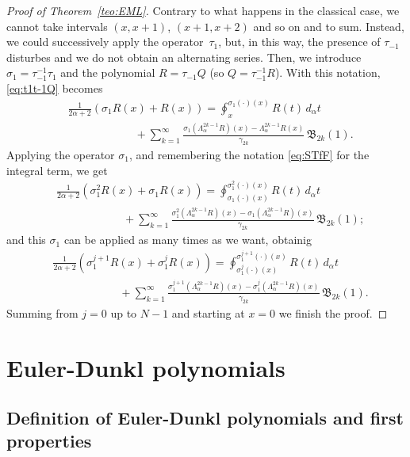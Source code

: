 \documentclass[10pt]{article}
\theoremstyle{plain}
\theoremstyle{definition}
\numberwithin{equation}{section} %
\newcommand{\La}{\Lambda_{\alpha}}
\newcommand{\B}{\mathfrak{B}}
\newcommand{\cc}{\gamma}
\begin{document}
\begin{proof}[Proof of Theorem~\ref{teo:EML}]
Contrary to what happens in the classical case, we cannot take intervals $(x,x+1)$, $(x+1,x+2)$ and so on and to sum. Instead, we could successively apply the operator~$\tau_1$, but, in this way, the presence of $\tau_{-1}$ disturbes and we do not obtain an alternating series. Then, we introduce $\sigma_1 = \tau_{-1}^{-1}\tau_1$ and the polynomial $R = \tau_{-1}Q$ (so $Q = \tau_{-1}^{-1}R$).
With this notation, \eqref{eq:t1t-1Q} becomes
\begin{align*}
  &\frac{1}{2\alpha+2} (\sigma_1 R(x)+ R(x)) 
  = \oint_{x}^{\sigma_1(\cdot)(x)} R(t)\,d_\alpha t \\
  &\qquad\qquad\qquad + \sum_{k=1}^{\infty} \frac{\sigma_1(\La^{2k-1} R)(x) 
    - \La^{2k-1} R(x)}{\cc_{2k}} \, \B_{2k}(1).
\end{align*}
Applying the operator $\sigma_1$, and remembering the notation \eqref{eq:STfF} for the integral term, we get
\begin{align*}
  &\frac{1}{2\alpha+2} (\sigma_1^2 R(x) + \sigma_1 R(x)) 
  = \oint_{\sigma_1(\cdot)(x)}^{\sigma_1^2(\cdot)(x)} R(t) \,d_\alpha t \\
  &\qquad\qquad\qquad + \sum_{k=1}^{\infty} \frac{\sigma_1^2(\La^{2k-1}R)(x) 
  - \sigma_1 (\La^{2k-1}R)(x)}{\cc_{2k}} \, \B_{2k}(1);
\end{align*}
and this $\sigma_1$ can be applied as many times as we want, obtainig
\begin{align*}
  &\frac{1}{2\alpha+2} (\sigma_1^{j+1} R(x) + \sigma_1^j R(x)) 
  = \oint_{\sigma_1^j(\cdot)(x)}^{\sigma_1^{j+1}(\cdot)(x)} R(t) \,d_\alpha t \\
  &\qquad\qquad\qquad + \sum_{k=1}^{\infty} \frac{\sigma_1^{j+1}(\La^{2k-1}R)(x) 
  - \sigma_1^j(\La^{2k-1}R)(x)}{\cc_{2k}} \, \B_{2k}(1).
\end{align*}
Summing from $j=0$ up to $N-1$ and starting at $x=0$ we finish the proof.
\end{proof}

\section{Euler-Dunkl polynomials}
\label{sec:ED}

\subsection{Definition of Euler-Dunkl polynomials and first properties}
\end{document}
